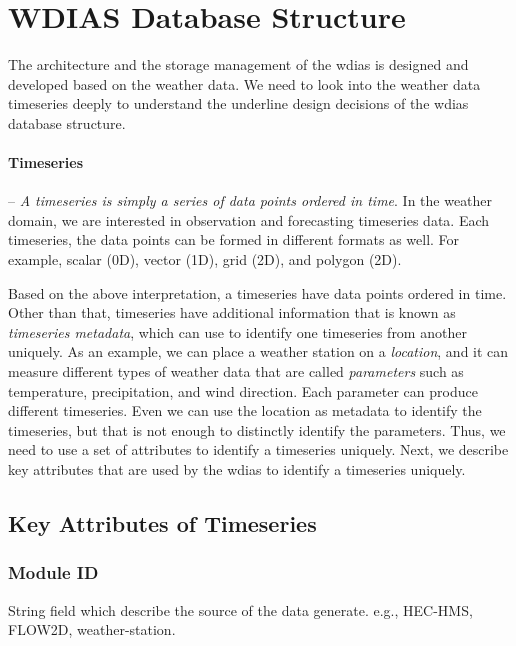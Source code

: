 \section{WDIAS Database Structure}
\label{se:db_struct}

The architecture and the storage management of the \acrshort{wdias} is designed and developed based on the weather data. We need to look into the weather data timeseries deeply to understand the underline design decisions of the \acrshort{wdias} database structure.

\paragraph{Timeseries}-- \emph{A timeseries is simply a series of data points ordered in time}. In the weather domain, we are interested in observation and forecasting timeseries data. Each timeseries, the data points can be formed in different formats as well. For example, scalar (0D), vector (1D), grid (2D), and polygon (2D).

Based on the above interpretation, a timeseries have data points ordered in time. Other than that, timeseries have additional information that is known as \emph{timeseries metadata}, which can use to identify one timeseries from another uniquely. As an example, we can place a weather station on a \emph{location}, and it can measure different types of weather data that are called \emph{parameters} such as temperature, precipitation, and wind direction. Each parameter can produce different timeseries. Even we can use the location as metadata to identify the timeseries, but that is not enough to distinctly identify the parameters. Thus, we need to use a set of attributes to identify a timeseries uniquely. Next, we describe key attributes that are used by the \acrshort{wdias} to identify a timeseries uniquely.


\subsection{Key Attributes of Timeseries}
\label{subse:timeseries_key_attributes}

\subsubsection{Module ID}
String field which describe the source of the data generate. e.g., HEC-HMS, FLOW2D, weather-station.

